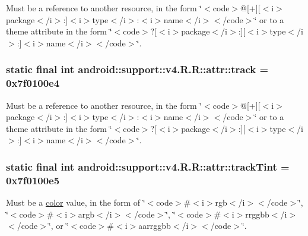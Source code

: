 Must be a reference to another resource, in the form \char`\"{}$<$code$>$@\mbox{[}+\mbox{]}\mbox{[}$<$i$>$package$<$/i$>$:\mbox{]}$<$i$>$type$<$/i$>$:$<$i$>$name$<$/i$>$$<$/code$>$\char`\"{} or to a theme attribute in the form \char`\"{}$<$code$>$?\mbox{[}$<$i$>$package$<$/i$>$:\mbox{]}\mbox{[}$<$i$>$type$<$/i$>$:\mbox{]}$<$i$>$name$<$/i$>$$<$/code$>$\char`\"{}. \hypertarget{classandroid_1_1support_1_1v4_1_1_r_1_1attr_ceb5894dc0bb984160f647155b7323b5}{
\subsubsection[{track}]{\setlength{\rightskip}{0pt plus 5cm}static final int android::support::v4.R.R::attr::track = 0x7f0100e4}}
\label{classandroid_1_1support_1_1v4_1_1_r_1_1attr_ceb5894dc0bb984160f647155b7323b5}


Must be a reference to another resource, in the form \char`\"{}$<$code$>$@\mbox{[}+\mbox{]}\mbox{[}$<$i$>$package$<$/i$>$:\mbox{]}$<$i$>$type$<$/i$>$:$<$i$>$name$<$/i$>$$<$/code$>$\char`\"{} or to a theme attribute in the form \char`\"{}$<$code$>$?\mbox{[}$<$i$>$package$<$/i$>$:\mbox{]}\mbox{[}$<$i$>$type$<$/i$>$:\mbox{]}$<$i$>$name$<$/i$>$$<$/code$>$\char`\"{}. \hypertarget{classandroid_1_1support_1_1v4_1_1_r_1_1attr_a3b33de16b6102b58a0026448e51e9c2}{
\subsubsection[{trackTint}]{\setlength{\rightskip}{0pt plus 5cm}static final int android::support::v4.R.R::attr::trackTint = 0x7f0100e5}}
\label{classandroid_1_1support_1_1v4_1_1_r_1_1attr_a3b33de16b6102b58a0026448e51e9c2}


Must be a \hyperlink{classandroid_1_1support_1_1v4_1_1_r_1_1color}{color} value, in the form of \char`\"{}$<$code$>$\#$<$i$>$rgb$<$/i$>$$<$/code$>$\char`\"{}, \char`\"{}$<$code$>$\#$<$i$>$argb$<$/i$>$$<$/code$>$\char`\"{}, \char`\"{}$<$code$>$\#$<$i$>$rrggbb$<$/i$>$$<$/code$>$\char`\"{}, or \char`\"{}$<$code$>$\#$<$i$>$aarrggbb$<$/i$>$$<$/code$>$\char`\"{}. 

